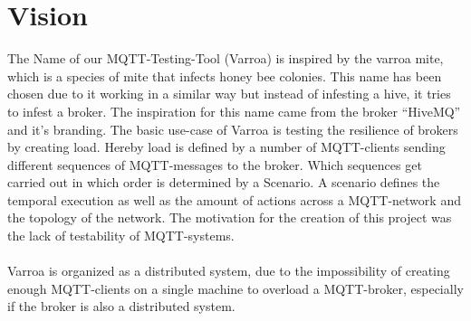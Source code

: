 \chapter{Vision}
The Name of our MQTT-Testing-Tool (Varroa) is inspired by the varroa mite, which is a species of mite that infects honey bee colonies.
This name has been chosen due to it working in a similar way but instead of infesting a hive, it tries to infest a broker.
The inspiration for this name came from the broker \enquote{HiveMQ} and it's branding.
The basic use-case of Varroa is testing the resilience of brokers by creating load.
Hereby load is defined by a number of MQTT-clients sending different sequences of MQTT-messages to the broker. 
Which sequences get carried out in which order is determined by a Scenario.
A scenario defines the temporal execution as well as the amount of actions across a MQTT-network and the topology of the network.
The motivation for the creation of this project was the lack of testability of MQTT-systems.\\
\\
Varroa is organized as a distributed system, due to the impossibility of creating enough MQTT-clients on a single machine to overload a MQTT-broker, especially if the broker is also a distributed system.

